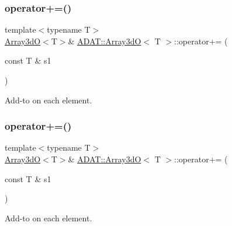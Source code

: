 \subsubsection{\texorpdfstring{operator+=()}{operator+=()}\hspace{0.1cm}{\footnotesize\ttfamily [4/6]}}
{\footnotesize\ttfamily template$<$typename T$>$ \\
\mbox{\hyperlink{classADAT_1_1Array3dO}{Array3dO}}$<$T$>$\& \mbox{\hyperlink{classADAT_1_1Array3dO}{A\+D\+A\+T\+::\+Array3dO}}$<$ T $>$\+::operator+= (\begin{DoxyParamCaption}\item[{const T \&}]{s1 }\end{DoxyParamCaption})\hspace{0.3cm}{\ttfamily [inline]}}



Add-\/to on each element. 

\mbox{\label{classADAT_1_1Array3dO_a6e5f624a1a14555b030d5fb53cb85f9c}} 
\subsubsection{\texorpdfstring{operator+=()}{operator+=()}\hspace{0.1cm}{\footnotesize\ttfamily [5/6]}}
{\footnotesize\ttfamily template$<$typename T$>$ \\
\mbox{\hyperlink{classADAT_1_1Array3dO}{Array3dO}}$<$T$>$\& \mbox{\hyperlink{classADAT_1_1Array3dO}{A\+D\+A\+T\+::\+Array3dO}}$<$ T $>$\+::operator+= (\begin{DoxyParamCaption}\item[{const T \&}]{s1 }\end{DoxyParamCaption})\hspace{0.3cm}{\ttfamily [inline]}}



Add-\/to on each element. 

\mbox{\label{classADAT_1_1Array3dO_a6e5f624a1a14555b030d5fb53cb85f9c}} 
